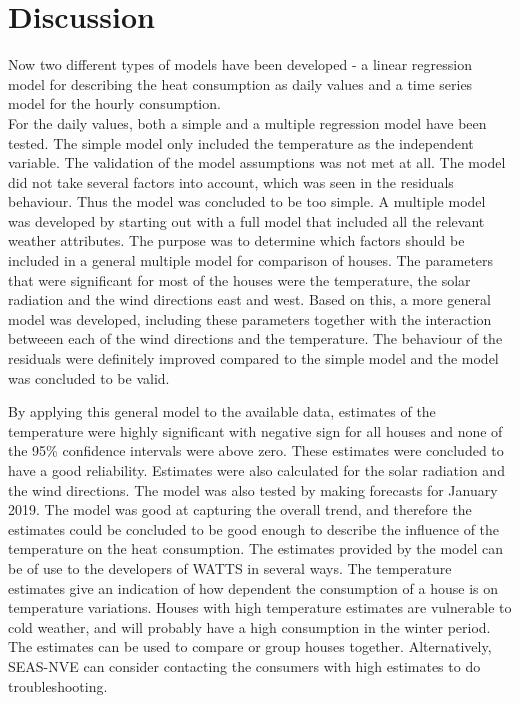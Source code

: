 \chapter{Discussion}
\label{chap: discussion}
Now two different types of models have been developed - a linear regression model for describing the heat consumption as daily values and a time series model for the hourly consumption. \\

\noindent For the daily values, both a simple and a multiple regression model have been tested. The simple model only included the temperature as the independent variable. The validation of the model assumptions was not met at all. The model did not take several factors into account, which was seen in the residuals behaviour. Thus the model was concluded to be too simple. A multiple model was developed by starting out with a full model that included all the relevant weather attributes. The purpose was to determine which factors should be included in a general multiple model for comparison of houses. The parameters that were significant for most of the houses were the temperature, the solar radiation and the wind directions east and west. Based on this, a more general model was developed, including these parameters together with the interaction betweeen each of the wind directions and the temperature. The behaviour of the residuals were definitely improved compared to the simple model and the model was concluded to be valid.

\noindent By applying this general model to the available data, estimates of the temperature were highly significant with negative sign for all houses and none of the 95\% confidence intervals were above zero. These estimates were concluded to have a good reliability. Estimates were also calculated for the solar radiation and the wind directions. The model was also tested by making forecasts for January 2019. The model was good at capturing the overall trend, and therefore the estimates could be concluded to be good enough to describe the influence of the temperature on the heat consumption. The estimates provided by the model can be of use to the developers of WATTS in several ways. The temperature estimates give an indication of how dependent the consumption of a house is on temperature variations. Houses with high temperature estimates are vulnerable to cold weather, and will probably have a high consumption in the winter period. The estimates can be used to compare or group houses together. Alternatively, SEAS-NVE can consider contacting the consumers with high estimates to do troubleshooting.\\

